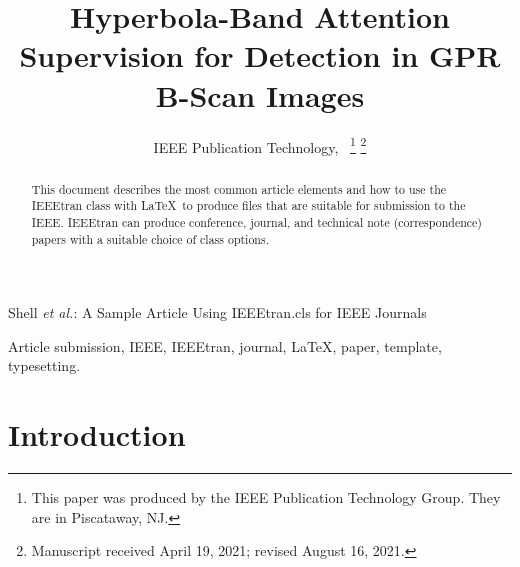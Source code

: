\documentclass[lettersize,journal]{IEEEtran}
\begin{document}
\title{Hyperbola-Band Attention Supervision for Detection in GPR B-Scan Images}

\author{IEEE Publication Technology,~
\thanks{This paper was produced by the IEEE Publication Technology Group. They are in Piscataway, NJ.}%
\thanks{Manuscript received April 19, 2021; revised August 16, 2021.}}

%
{Shell \MakeLowercase{\textit{et al.}}: A Sample Article Using IEEEtran.cls for IEEE Journals}


\maketitle

\begin{abstract}
This document describes the most common article elements and how to use the IEEEtran class with \LaTeX \ to produce files that are suitable for submission to the IEEE.  IEEEtran can produce conference, journal, and technical note (correspondence) papers with a suitable choice of class options. 
\end{abstract}

\begin{IEEEkeywords}
Article submission, IEEE, IEEEtran, journal, \LaTeX, paper, template, typesetting.
\end{IEEEkeywords}

\section{Introduction}
\end{document}
